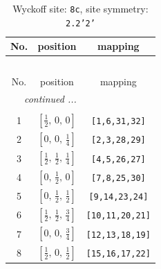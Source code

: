 \documentclass[fleqn,8pt]{jsarticle}
\begin{document}
\begin{longtable}{ccc}
\caption{Wyckoff site: {\tt 8c}, site symmetry: {\tt 2.2'2'}}
 \\
 \hline \hline
No. & position & mapping \\ \hline \endfirsthead

\multicolumn{2}{l}{\tablename\ \thetable{}} \\
 \hline \hline
No. & position & mapping \\ \hline \endhead

 \hline \hline
\multicolumn{2}{r}{\footnotesize\it continued ...} \\ \endfoot

 \hline \hline
\multicolumn{2}{r}{} \\ \endlastfoot

1 & $\left[ \frac{1}{2},\, 0,\, 0 \right]$ & {\tt [1,6,31,32]} \\ \hline
2 & $\left[ 0,\, 0,\, \frac{1}{4} \right]$ & {\tt [2,3,28,29]} \\ \hline
3 & $\left[ \frac{1}{2},\, \frac{1}{2},\, \frac{1}{4} \right]$ & {\tt [4,5,26,27]} \\ \hline
4 & $\left[ 0,\, \frac{1}{2},\, 0 \right]$ & {\tt [7,8,25,30]} \\ \hline
5 & $\left[ 0,\, \frac{1}{2},\, \frac{1}{2} \right]$ & {\tt [9,14,23,24]} \\ \hline
6 & $\left[ \frac{1}{2},\, \frac{1}{2},\, \frac{3}{4} \right]$ & {\tt [10,11,20,21]} \\ \hline
7 & $\left[ 0,\, 0,\, \frac{3}{4} \right]$ & {\tt [12,13,18,19]} \\ \hline
8 & $\left[ \frac{1}{2},\, 0,\, \frac{1}{2} \right]$ & {\tt [15,16,17,22]} \\
\end{longtable}
\renewcommand{\arraystretch}{1.2}
\end{document}
